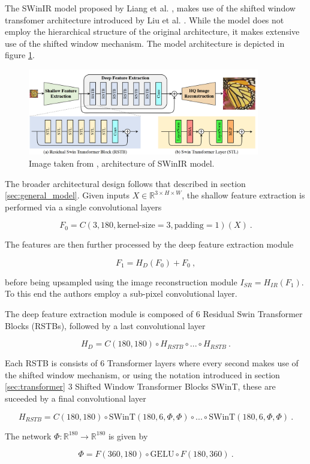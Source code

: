 The SWinIR model proposed by Liang et al. \cite{liangSwinIRImageRestoration2021a}, 
makes use of the shifted window transfomer architecture introduced by Liu et al. \cite{liangSwinIRImageRestoration2021a}.
While the model does not employ the hierarchical structure of the original architecture, 
it makes extensive use of the shifted window mechanism.
The model architecture is depicted in figure \ref{fig:swinir_model}.

\begin{figure}[h!]
    \includegraphics[width=0.9\textwidth]{models/sisr/imgs/swinir_model.png}
    \caption{Image taken from \cite{liangSwinIRImageRestoration2021a}, architecture of SWinIR model.}
    \label{fig:swinir_model}
\end{figure}

The broader architectural design follows that described in section \ref{sec:general_model}.
Given inputs $X \in \mathbb R^{3 \times H \times W}$, 
the shallow feature extraction is performed via a single convolutional layers

    $$F_0 = C(3, 180, \text{kernel-size}=3, \text{padding}=1)(X) ~.$$

The features are then further processed by the deep feature extraction module

    $$F_1 = H_D(F_0) + F_0 ~,$$

before being upsampled using the image reconstruction module $I_{SR} = H_{IR}(F_1)$.
To this end the authors employ a sub-pixel convolutional layer. \newline

The deep feature extraction module is composed of $6$ Residual Swin Transformer Blocks (RSTBs),
followed by a last convolutional layer

    $$H_D = C(180, 180) \circ H_{RSTB} \circ ... \circ H_{RSTB} ~.$$

Each RSTB is consists of $6$ Transformer layers where every second makes use of the shifted window mechanism,
or using the notation introduced in section \ref{sec:transformer} $3$ Shifted Window Transformer Blocks SWinT,
these are suceeded by a final convolutional layer

    $$H_{RSTB} = C(180, 180) \circ \text{SWinT}(180, 6, \Phi, \Phi) \circ ... \circ \text{SWinT}(180, 6, \Phi, \Phi) ~.$$

The network $\Phi : \mathbb R^{180} \to \mathbb R^{180}$ is given by

    \begin{equation} \label{eq:phi}
        \Phi = F(360, 180) \circ \text{GELU} \circ F(180, 360) ~. 
    \end{equation}

